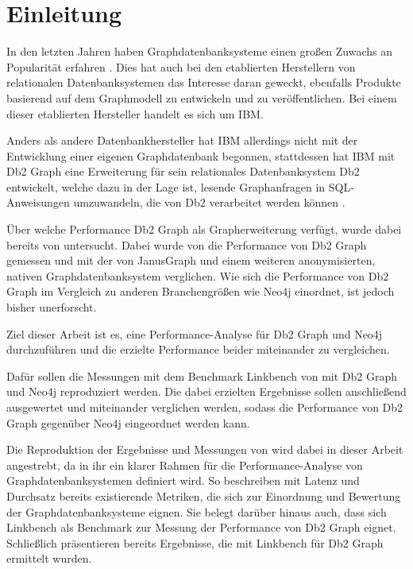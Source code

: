 \chapter{Einleitung}
\label{einleitung}

In den letzten Jahren haben Graphdatenbanksysteme einen großen Zuwachs an Popularität erfahren \cite{db_engines_ranking_july}. Dies hat auch bei den etablierten Herstellern von relationalen Datenbanksystemen das Interesse daran geweckt, ebenfalls Produkte basierend auf dem Graphmodell zu entwickeln und zu veröffentlichen. Bei einem dieser etablierten Hersteller handelt es sich um IBM. 

Anders als andere Datenbankhersteller hat IBM allerdings nicht mit der Entwicklung einer eigenen Graphdatenbank begonnen, stattdessen hat IBM mit Db2 Graph eine Erweiterung für sein relationales Datenbanksystem Db2 entwickelt, welche dazu in der Lage ist, lesende Graphanfragen in SQL-Anweisungen umzuwandeln, die von Db2 verarbeitet werden können \cite{sigmod_tian}. 

Über welche Performance Db2 Graph als Grapherweiterung verfügt, wurde dabei bereits von  untersucht. Dabei wurde von  die Performance von Db2 Graph gemessen und mit der von JanusGraph und einem weiteren anonymisierten, nativen Graphdatenbanksystem verglichen. Wie sich die Performance von Db2 Graph im Vergleich zu anderen Branchengrößen wie Neo4j einordnet, ist jedoch bisher unerforscht. 

Ziel dieser Arbeit ist es, eine Performance-Analyse für Db2 Graph und Neo4j durchzuführen und die erzielte Performance beider miteinander zu vergleichen.

Dafür sollen die Messungen mit dem Benchmark Linkbench von  mit Db2 Graph und Neo4j reproduziert werden. Die dabei erzielten Ergebnisse sollen anschließend ausgewertet und miteinander verglichen werden, sodass die Performance von Db2 Graph gegenüber Neo4j eingeordnet werden kann.

Die Reproduktion der Ergebnisse und Messungen von  wird dabei in dieser Arbeit angestrebt, da in ihr ein klarer Rahmen für die Performance-Analyse von Graphdatenbanksystemen definiert wird. So beschreiben  mit Latenz und Durchsatz bereits existierende Metriken, die sich zur Einordnung und Bewertung der Graphdatenbanksysteme eignen. Sie belegt darüber hinaus auch, dass sich Linkbench als Benchmark zur Messung der Performance von Db2 Graph eignet. Schließlich präsentieren  bereits Ergebnisse, die mit Linkbench für Db2 Graph ermittelt wurden. 

